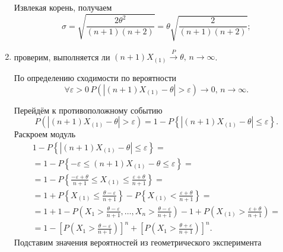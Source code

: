 \begin{enumerate}[label=\alph*)]
  Извлекая корень, получаем
  $$ \sigma =
    \sqrt{ \frac{2 \theta^2}{ \left( n + 1 \right) \left( n + 2 \right) }} =
    \theta \sqrt{ \frac{2}{ \left( n + 1 \right) \left( n + 2 \right) }};$$
  \item проверим,
  выполняется ли
  $ \left( n + 1 \right) X_{ \left( 1 \right) } \overset{P}{ \to } \theta, \,
    n \to \infty $.

  По определению сходимости по вероятности
  $$ \forall \varepsilon > 0 \,
    P \left(
      \left| \left( n + 1 \right) X_{ \left( 1 \right) } - \theta \right| > \varepsilon
    \right) \to 0, \,
    n \to \infty.$$

  Перейдём к противоположному событию
  $$P \left(
    \left| \left( n + 1 \right) X_{ \left( 1 \right) } - \theta \right| > \varepsilon
  \right) =
  1 -
  P \left\{
    \left| \left( n + 1 \right) X_{ \left( 1 \right) } - \theta \right| \leq \varepsilon
  \right\}.$$
  Раскроем модуль
  \begin{equation*}
    \begin{split}
      1 - P \left\{
        \left| \left( n + 1 \right) X_{ \left( 1 \right) } - \theta \right| \leq \varepsilon
      \right\} = \\
      = 1 - P \left\{
        - \varepsilon \leq \left( n + 1 \right) X_{ \left( 1 \right) } - \theta \leq \varepsilon
      \right\} = \\
      = 1 - P \left\{
        \frac{- \varepsilon + \theta }{n + 1} \leq
        X_{ \left( 1 \right) } \leq
        \frac{ \varepsilon + \theta }{n + 1}
      \right\} = \\
      = 1 + P \left\{ X_{ \left( 1 \right) } \leq \frac{ \theta - \varepsilon }{n + 1} \right\} -
      P \left\{ X_{ \left( 1 \right) } < \frac{ \varepsilon + \theta }{n + 1} \right\} = \\
      = 1 + 1 - P \left(
        X_1 > \frac{ \theta - \varepsilon }{n + 1},
        \dotsc,
        X_n > \frac{ \theta - \varepsilon }{n + 1}
      \right) -
      1 + P \left( X_{ \left( 1 \right) } > \frac{ \varepsilon + \theta }{n + 1} \right) = \\
      = 1 - \left[ P \left( X_1 > \frac{ \theta - \varepsilon }{n + 1} \right) \right]^n +
      \left[ P \left( X_1 > \frac{ \theta + \varepsilon}{n + 1} \right) \right]^n.
    \end{split}
  \end{equation*}
  Подставим значения вероятностей из геометрического эксперимента
  \begin{equation*}
    \begin{split}

\end{split}
\end{equation*}
\end{enumerate}
